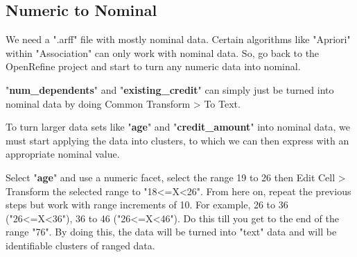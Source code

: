 \documentclass[10pt, a4paper]{article}
\begin{document}
    \subsection{Numeric to Nominal}
    We need a ".arff" file with mostly nominal data. Certain algorithms like "Apriori" within "Association" can only work with nominal data. So, go back to the OpenRefine project and start to turn any numeric data into nominal.
    
    "\textbf{num\_dependents}" and "\textbf{existing\_credit}" can simply just be turned into nominal data by doing Common Transform > To Text.
    
    To turn larger data sets like "\textbf{age}" and "\textbf{credit\_amount}" into nominal data, we must start applying the data into clusters, to which we can then express with an appropriate nominal value.
    
    Select "\textbf{age}" and use a numeric facet, select the range 19 to 26 then  Edit Cell > Transform the selected range to "18<=X<26". From here on, repeat the previous steps but work with range increments of 10. For example,  26 to 36 ("26<=X<36"), 36 to 46 ("26<=X<46"). Do this till you get to the end of the range "76". By doing this, the data will be turned into "text" data and will be identifiable clusters of ranged data.
    
    
    
    
    
    
    
    
 
	
	

	
	


		
\end{document}
